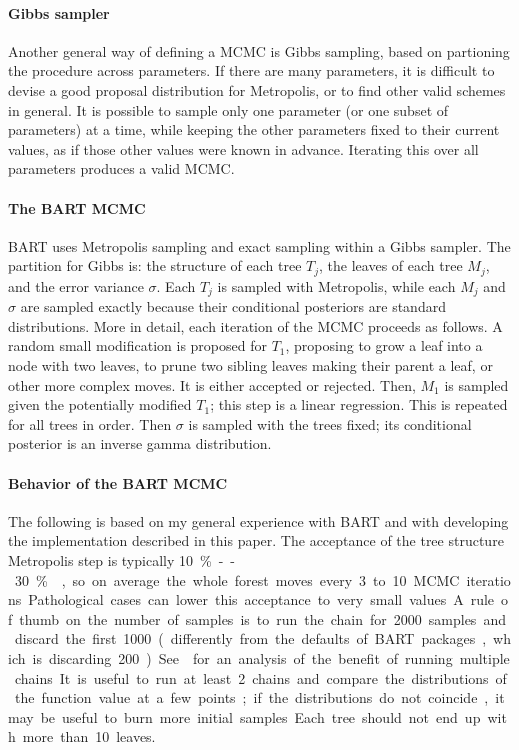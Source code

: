 \documentclass{article}
\begin{document}
    \paragraph{Gibbs sampler}

    Another general way of defining a MCMC is Gibbs sampling, based on partioning the procedure across parameters. If there are many parameters, it is difficult to devise a good proposal distribution for Metropolis, or to find other valid schemes in general. It is possible to sample only one parameter (or one subset of parameters) at a time, while keeping the other parameters fixed to their current values, as if those other values were known in advance. Iterating this over all parameters produces a valid MCMC.

    \paragraph{The BART MCMC}

    BART uses Metropolis sampling and exact sampling within a Gibbs sampler. The partition for Gibbs is: the structure of each tree $T_j$, the leaves of each tree $M_j$, and the error variance $\sigma$. Each $T_j$ is sampled with Metropolis, while each $M_j$ and $\sigma$ are sampled exactly because their conditional posteriors are standard distributions. More in detail, each iteration of the MCMC proceeds as follows. A random small modification is proposed for $T_1$, proposing to grow a leaf into a node with two leaves, to prune two sibling leaves making their parent a leaf, or other more complex moves. It is either accepted or rejected. Then, $M_1$ is sampled given the potentially modified $T_1$; this step is a linear regression. This is repeated for all trees in order. Then $\sigma$ is sampled with the trees fixed; its conditional posterior is an inverse gamma distribution.

    \paragraph{Behavior of the BART MCMC}

    The following is based on my general experience with BART and with developing the implementation described in this paper. The acceptance of the tree structure Metropolis step is typically \SI{10}\%--\SI{30}\% \autocite[see also][891]{pratola2016}, so on average the whole forest moves every 3 to 10 MCMC iterations. Pathological cases can lower this acceptance to very small values. A rule of thumb on the number of samples is to run the chain for 2000 samples and discard the first 1000 (differently from the defaults of BART packages, which is discarding 200). See \textcite[fig.~7, p.~20]{tan2024} for an analysis of the benefit of running multiple chains. It is useful to run at least 2 chains and compare the distributions of the function value at a few points; if the distributions do not coincide, it may be useful to burn more initial samples. Each tree should not end up with more than 10 leaves.
\end{document}
